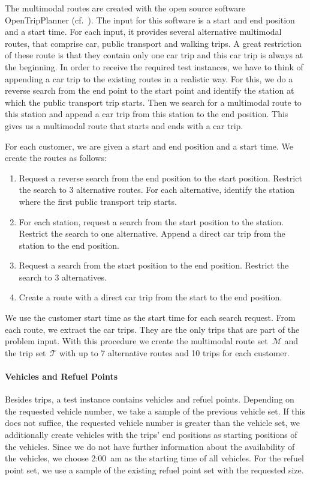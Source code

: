 The multimodal routes are created with the open source software Open\-Trip\-Planner (cf.~\cite{OTP}). The input for this software is a start and end position and a start time. For each input, it provides several alternative multimodal routes, that comprise car, public transport and walking trips. A great restriction of these route is that they contain only one car trip and this car trip is always at the beginning. In order to receive the required test instances, we have to think of appending a car trip to the existing routes in a realistic way. For this, we do a reverse search from the end point to the start point and identify the station at which the public transport trip starts. Then we search for a multimodal route to this station and append a car trip from this station to the end position. This gives us a multimodal route that starts and ends with a car trip.

For each customer, we are given a start and end position and a start time. We create the routes as follows:
\begin{enumerate}
	\item Request a reverse search from the end position to the start position. Restrict the search to 3 alternative routes. For each alternative, identify the station where the first public transport trip starts.
	\item For each station, request a search from the start position to the station. Restrict the search to one alternative. Append a direct car trip from the station to the end position.
	\item Request a search from the start position to the end position. Restrict the search to 3 alternatives.
	\item Create a route with a direct car trip from the start to the end position.
\end{enumerate}

We use the customer start time as the start time for each search request. From each route, we extract the car trips. They are the only trips that are part of the problem input. With this procedure we create the multimodal route set~$\mathcal{M}$ and the trip set~$\mathcal{T}$ with up to 7 alternative routes and 10 trips for each customer.

\paragraph{Vehicles and Refuel Points} \parfill

Besides trips, a test instance contains vehicles and refuel points. Depending on the requested vehicle number, we take a sample of the previous vehicle set. If this does not suffice, \ie the requested vehicle number is greater than the vehicle set, we additionally create vehicles with the trips' end positions as starting positions of the vehicles. Since we do not have further information about the availability of the vehicles, we choose 2:00~am as the starting time of all vehicles. For the refuel point set, we use a sample of the existing refuel point set with the requested size.

